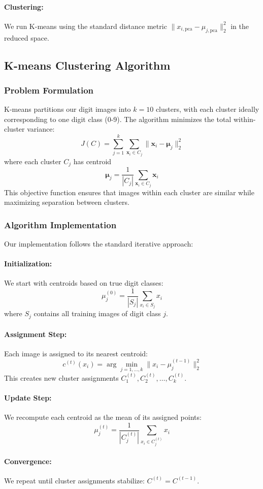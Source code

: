 \documentclass{article}
\begin{document}
\paragraph{Clustering:} We run K-means using the standard distance metric $\|x_{i,\text{pca}} - \mu_{j,\text{pca}}\|_2^2$ in the reduced space.

\subsection{K-means Clustering Algorithm}
\subsubsection{Problem Formulation}
K-means partitions our digit images into $k = 10$ clusters, with each cluster ideally corresponding to one digit class (0-9). The algorithm minimizes the total within-cluster variance: $$J(C) = \sum_{j=1}^k \sum_{\mathbf{x}_i \in C_j} \|\mathbf{x}_i - \boldsymbol{\mu}_j\|_2^2$$ where each cluster $C_j$ has centroid $$\boldsymbol{\mu}_j = \frac{1}{|C_j|} \sum_{\mathbf{x}_i \in C_j} \mathbf{x}_i$$ This objective function ensures that images within each cluster are similar while maximizing separation between clusters.
\subsubsection{Algorithm Implementation}
Our implementation follows the standard iterative approach:
\paragraph{Initialization:} We start with centroids based on true digit classes: $$\mu_j^{(0)} = \frac{1}{|S_j|} \sum_{x_i \in S_j} x_i$$ where $S_j$ contains all training images of digit class $j$.
\paragraph{Assignment Step:} Each image is assigned to its nearest centroid: $$c^{(t)}(x_i) = \arg\min_{j=1,\ldots,k} \|x_i - \mu_j^{(t-1)}\|_2^2$$ This creates new cluster assignments $C_1^{(t)}, C_2^{(t)}, \ldots, C_k^{(t)}$.
\paragraph{Update Step:} We recompute each centroid as the mean of its assigned points: $$\mu_j^{(t)} = \frac{1}{|C_j^{(t)}|} \sum_{x_i \in C_j^{(t)}} x_i$$
\paragraph{Convergence:} We repeat until cluster assignments stabilize: $C^{(t)} = C^{(t-1)}$.
\end{document}
